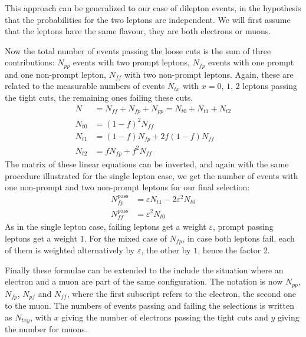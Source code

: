 This approach can be generalized to our case of dilepton events, 
in the hypothesis that the probabilities for the two leptons are independent. We will
first assume that the leptons have the same flavour, \ie they are both
electrons or muons.

Now the total number of events passing the loose cuts is the sum of three
contributions: $N_{pp}$ events with two prompt leptons, $N_{fp}$ events with
one prompt and one non-prompt lepton, $N_{ff}$ with two non-prompt leptons.
Again, these are related to the measurable numbers of events $N_{tx}$ with
 $x = 0$, $1$, $2$ leptons passing the tight cuts, the remaining ones
 failing these cuts.
\begin{align*}
    N &= N_{ff} + N_{fp} + N_{pp} = N_{t0} + N_{t1} + N_{t2}\\
    N_{t0} &= (1 - f)^2 N_{ff}\\
    N_{t1} &= (1 - f) N_{fp} + 2f(1 - f)N_{ff}\\
    N_{t2} &= fN_{fp} + f^2N_{ff}
\end{align*}
The matrix of these linear equations can be inverted, and again with the
same procedure illustrated for the single lepton case, we get the number of
events with one non-prompt and two non-prompt leptons for our final
selection:
\begin{align*}
    N_{fp}^\text{pass} &= \varepsilon N_{t1} - 2 \varepsilon^{2} N_{t0}\\
    N_{ff}^\text{pass} &= \varepsilon^2 N_{t0}
\end{align*}
As in the single lepton case, failing leptons get a weight $\varepsilon$,
prompt passing leptons get a weight $1$.
For the mixed case of $N_{fp}$, in case both leptons fail, each of them is
weighted alternatively by $\varepsilon$, the other by $1$, hence the factor
2. 

Finally these formulae can be extended to the include the situation where an
electron and a muon are part of the same configuration.
The notation is now $N_{pp}$, $N_{fp}$, $N_{pf}$ and $N_{ff}$, where the
first subscript refers to the electron, the second one to the muon. The
numbers of events passing and failing the selections is written as
$N_{txy}$, with $x$ giving the number of electrons passing the tight cuts
and $y$ giving the number for muons.

